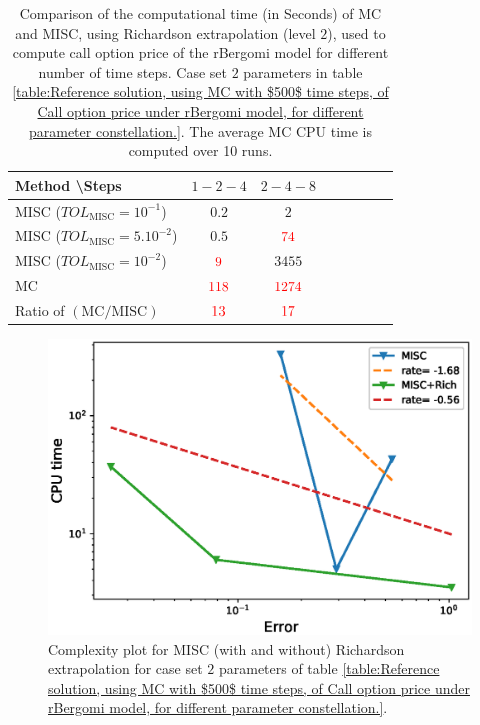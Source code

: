 \begin{table}[!h]
	\centering
	\begin{tabular}{l*{6}{c}r}
		Method \textbackslash  Steps            & $1-2-4$ & $2-4-8$   \\
		\hline
		MISC ($TOL_{\text{MISC}}=10^{-1}$)  & $0.2$ & $2$ &   \\
		MISC ($TOL_{\text{MISC}}=5.10^{-2}$)  & $0.5$ & ${\color{red}74}$  \\
		MISC ($TOL_{\text{MISC}}=10^{-2}$)  & ${\color{red}9}$ & $3455$   \\
		\hline
		MC    & $ {\color{red}  118}$  & ${\color{red}1274}$  \\
		
		\hline
		Ratio of $\left(\text{MC}/ \text{MISC} \right)$  &${\color{red}13}$ & ${\color{red}  17}$   \\
		\hline
	\end{tabular}
	\caption{Comparison of the computational time (in Seconds) of  MC and MISC, using Richardson extrapolation (level $2$), used to compute call option price of the rBergomi model for different number of time steps. Case set $2$ parameters in table \ref{table:Reference solution, using MC with $500$ time steps, of Call option price under rBergomi model, for different parameter constellation.}. The
		average MC CPU time is computed over 10 runs.}
	\label{Comparsion of the computational time of  MC and MISC, using Richardson extrapolation (level $2$), used to compute Call option price of rBergomi model for different number of time steps. Case set $2$ parameters,linear}
\end{table}


\begin{figure}[h!]
	\centering
	\includegraphics[width=0.4\linewidth]{./figures/rBergomi_Complexity_rates/set2/error_vs_time_set2_comparison_linear}
	
	\caption{Complexity plot for  MISC (with and without) Richardson extrapolation for case set $2$ parameters of table \ref{table:Reference solution, using MC with $500$ time steps, of Call option price under rBergomi model, for different parameter constellation.}.}
	\label{fig:Complexity plot for  MISC for Case set $2$ parameters, comparison}
\end{figure}




